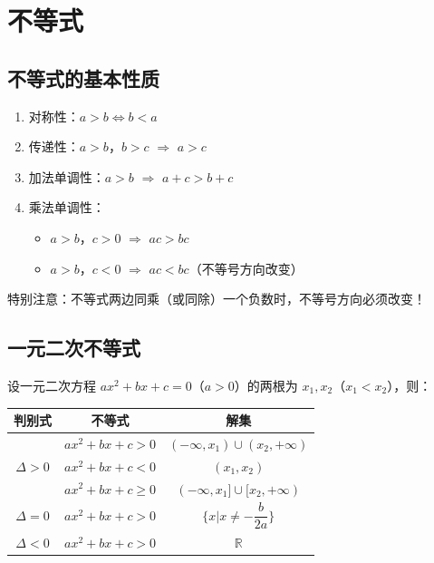 \chapter{不等式}

\section{不等式的基本性质}

\begin{theorem}[不等式的基本性质]
\begin{enumerate}
    \item 对称性：$a > b \Leftrightarrow b < a$
    \item 传递性：$a > b$，$b > c$ $\Rightarrow$ $a > c$
    \item 加法单调性：$a > b$ $\Rightarrow$ $a + c > b + c$
    \item 乘法单调性：
    \begin{itemize}
        \item $a > b$，$c > 0$ $\Rightarrow$ $ac > bc$
        \item $a > b$，$c < 0$ $\Rightarrow$ $ac < bc$（不等号方向改变）
    \end{itemize}
\end{enumerate}
\end{theorem}

\begin{note}
特别注意：不等式两边同乘（或同除）一个负数时，不等号方向必须改变！
\end{note}

\section{一元二次不等式}

\begin{theorem}[一元二次不等式的解法]
设一元二次方程 $ax^2 + bx + c = 0$（$a > 0$）的两根为 $x_1, x_2$（$x_1 < x_2$），则：

\begin{center}
\begin{tabular}{c|c|c}
\toprule
判别式 & 不等式 & 解集 \\
\midrule
\multirow{3}{*}{$\Delta > 0$} & $ax^2 + bx + c > 0$ & $(-\infty, x_1) \cup (x_2, +\infty)$ \\
& $ax^2 + bx + c < 0$ & $(x_1, x_2)$ \\
& $ax^2 + bx + c \geq 0$ & $(-\infty, x_1] \cup [x_2, +\infty)$ \\
\midrule
$\Delta = 0$ & $ax^2 + bx + c > 0$ & $\{x | x \neq -\dfrac{b}{2a}\}$ \\
\midrule
$\Delta < 0$ & $ax^2 + bx + c > 0$ & $\mathbb{R}$ \\
\bottomrule
\end{tabular}
\end{center}
\end{theorem}

